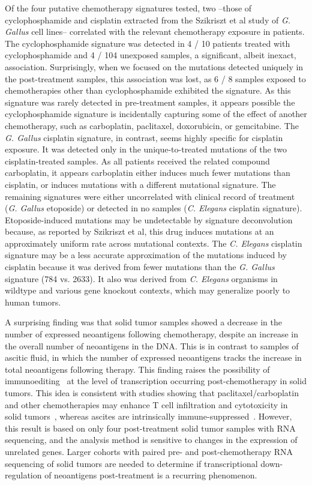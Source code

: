 Of the four putative chemotherapy signatures tested, two --those of cyclophosphamide and cisplatin extracted from the Szikriszt et al study of \textit{G. Gallus} cell lines-- correlated with the relevant chemotherapy exposure in patients. The cyclophosphamide signature was detected in 4 / 10 patients treated with cyclophosphamide and 4 / 104 unexposed samples, a significant, albeit inexact, association. Surprisingly, when we focused on the mutations detected uniquely in the post-treatment samples, this association was lost, as 6 / 8 samples exposed to chemotherapies other than cyclophosphamide exhibited the signature. As this signature was rarely detected in pre-treatment samples, it appears possible the cyclophosphamide signature is incidentally capturing some of the effect of another chemotherapy, such as carboplatin, paclitaxel, doxorubicin, or gemcitabine. The \textit{G. Gallus} cisplatin signature, in contrast, seems highly specific for cisplatin exposure. It was detected only in the unique-to-treated mutations of the two cisplatin-treated samples. As all patients received the related compound carboplatin, it appears carboplatin either induces much fewer mutations than cisplatin, or induces mutations with a different mutational signature. The remaining signatures were either uncorrelated with clinical record of treatment (\textit{G. Gallus} etoposide) or detected in no samples (\textit{C. Elegans} cisplatin signature). Etoposide-induced mutations may be undetectable by signature deconvolution because, as reported by Szikriszt et al, this drug induces mutations at an approximately uniform rate across mutational contexts. The \textit{C. Elegans} cisplatin signature may be a less accurate approximation of the mutations induced by cisplatin because it was derived from fewer mutations than the \textit{G. Gallus} signature (784 vs. 2633). It also was derived from \textit{C. Elegans} organisms in wildtype and various gene knockout contexts, which may generalize poorly to human tumors.


A surprising finding was that solid tumor samples showed a decrease in the number of expressed neoantigens following chemotherapy, despite an increase in the overall number of neoantigens in the DNA. This is in contrast to samples of ascitic fluid, in which the number of expressed neoantigens tracks the increase in total neoantigens following therapy. This finding raises the possibility of immunoediting~\cite{Dunn_2002} at the level of transcription occurring post-chemotherapy in solid tumors. This idea is consistent with studies showing that paclitaxel/carboplatin and other chemotherapies may enhance T cell infiltration and cytotoxicity in solid tumors~\cite{Demaria2001,Wu_2009,Pfannenstiel_2010,Hodge_2013}, whereas ascites are intrinsically immune-suppressed~\cite{Giuntoli2009,Simpson-Abelson2013,Singel2016}. However, this result is based on only four post-treatment solid tumor samples with RNA sequencing, and the analysis method is sensitive to changes in the expression of unrelated genes. Larger cohorts with paired pre- and post-chemotherapy RNA sequencing of solid tumors are needed to determine if transcriptional down-regulation of neoantigens post-treatment is a recurring phenomenon.

